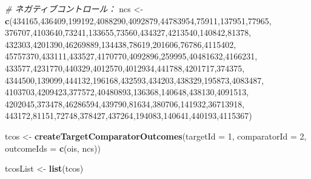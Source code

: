 \documentclass[
  11pt]{book}
\newenvironment{Shaded}{\begin{snugshade}}{\end{snugshade}}
\newcommand{\AttributeTok}[1]{\textcolor[rgb]{0.13,0.29,0.53}{#1}}
\newcommand{\CommentTok}[1]{\textcolor[rgb]{0.56,0.35,0.01}{\textit{#1}}}
\newcommand{\DecValTok}[1]{\textcolor[rgb]{0.00,0.00,0.81}{#1}}
\newcommand{\FunctionTok}[1]{\textcolor[rgb]{0.13,0.29,0.53}{\textbf{#1}}}
\newcommand{\NormalTok}[1]{#1}
\newcommand{\OtherTok}[1]{\textcolor[rgb]{0.56,0.35,0.01}{#1}}
\theoremstyle{definition}
\theoremstyle{definition}
\theoremstyle{definition}
\theoremstyle{definition}
\theoremstyle{remark}
\begin{document}
\begin{Shaded}
\begin{Highlighting}[]
\CommentTok{\# ネガティブコントロール：}
\NormalTok{ncs }\OtherTok{\textless{}{-}} \FunctionTok{c}\NormalTok{(}\DecValTok{434165}\NormalTok{,}\DecValTok{436409}\NormalTok{,}\DecValTok{199192}\NormalTok{,}\DecValTok{4088290}\NormalTok{,}\DecValTok{4092879}\NormalTok{,}\DecValTok{44783954}\NormalTok{,}\DecValTok{75911}\NormalTok{,}\DecValTok{137951}\NormalTok{,}\DecValTok{77965}\NormalTok{,}
         \DecValTok{376707}\NormalTok{,}\DecValTok{4103640}\NormalTok{,}\DecValTok{73241}\NormalTok{,}\DecValTok{133655}\NormalTok{,}\DecValTok{73560}\NormalTok{,}\DecValTok{434327}\NormalTok{,}\DecValTok{4213540}\NormalTok{,}\DecValTok{140842}\NormalTok{,}\DecValTok{81378}\NormalTok{,}
         \DecValTok{432303}\NormalTok{,}\DecValTok{4201390}\NormalTok{,}\DecValTok{46269889}\NormalTok{,}\DecValTok{134438}\NormalTok{,}\DecValTok{78619}\NormalTok{,}\DecValTok{201606}\NormalTok{,}\DecValTok{76786}\NormalTok{,}\DecValTok{4115402}\NormalTok{,}
         \DecValTok{45757370}\NormalTok{,}\DecValTok{433111}\NormalTok{,}\DecValTok{433527}\NormalTok{,}\DecValTok{4170770}\NormalTok{,}\DecValTok{4092896}\NormalTok{,}\DecValTok{259995}\NormalTok{,}\DecValTok{40481632}\NormalTok{,}\DecValTok{4166231}\NormalTok{,}
         \DecValTok{433577}\NormalTok{,}\DecValTok{4231770}\NormalTok{,}\DecValTok{440329}\NormalTok{,}\DecValTok{4012570}\NormalTok{,}\DecValTok{4012934}\NormalTok{,}\DecValTok{441788}\NormalTok{,}\DecValTok{4201717}\NormalTok{,}\DecValTok{374375}\NormalTok{,}
         \DecValTok{4344500}\NormalTok{,}\DecValTok{139099}\NormalTok{,}\DecValTok{444132}\NormalTok{,}\DecValTok{196168}\NormalTok{,}\DecValTok{432593}\NormalTok{,}\DecValTok{434203}\NormalTok{,}\DecValTok{438329}\NormalTok{,}\DecValTok{195873}\NormalTok{,}\DecValTok{4083487}\NormalTok{,}
         \DecValTok{4103703}\NormalTok{,}\DecValTok{4209423}\NormalTok{,}\DecValTok{377572}\NormalTok{,}\DecValTok{40480893}\NormalTok{,}\DecValTok{136368}\NormalTok{,}\DecValTok{140648}\NormalTok{,}\DecValTok{438130}\NormalTok{,}\DecValTok{4091513}\NormalTok{,}
         \DecValTok{4202045}\NormalTok{,}\DecValTok{373478}\NormalTok{,}\DecValTok{46286594}\NormalTok{,}\DecValTok{439790}\NormalTok{,}\DecValTok{81634}\NormalTok{,}\DecValTok{380706}\NormalTok{,}\DecValTok{141932}\NormalTok{,}\DecValTok{36713918}\NormalTok{,}
         \DecValTok{443172}\NormalTok{,}\DecValTok{81151}\NormalTok{,}\DecValTok{72748}\NormalTok{,}\DecValTok{378427}\NormalTok{,}\DecValTok{437264}\NormalTok{,}\DecValTok{194083}\NormalTok{,}\DecValTok{140641}\NormalTok{,}\DecValTok{440193}\NormalTok{,}\DecValTok{4115367}\NormalTok{)}

\NormalTok{tcos }\OtherTok{\textless{}{-}} \FunctionTok{createTargetComparatorOutcomes}\NormalTok{(}\AttributeTok{targetId =} \DecValTok{1}\NormalTok{,}
                                       \AttributeTok{comparatorId =} \DecValTok{2}\NormalTok{,}
                                       \AttributeTok{outcomeIds =} \FunctionTok{c}\NormalTok{(ois, ncs))}

\NormalTok{tcosList }\OtherTok{\textless{}{-}} \FunctionTok{list}\NormalTok{(tcos)}
\end{Highlighting}
\end{Shaded}
\end{document}

